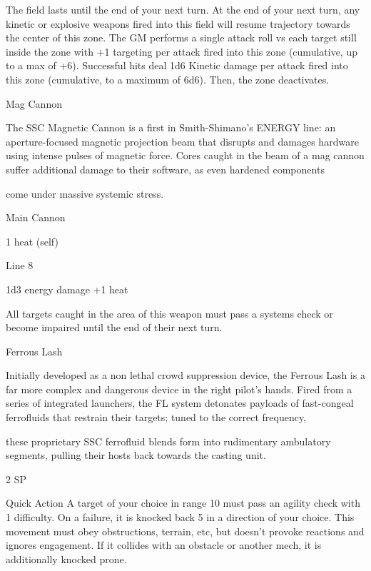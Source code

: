  The field lasts until the end of your next turn. At the end of your next turn, any kinetic or explosive  
 weapons fired into this field will resume trajectory towards the center of this zone. The GM performs a  
  single attack roll vs each target still inside the zone with +1 targeting per attack fired into this zone  
  (cumulative, up to a max of +6). Successful hits deal 1d6 Kinetic damage per attack fired into this zone  
  (cumulative, to a maximum of 6d6). Then, the zone deactivates. 

Mag Cannon  

The SSC Magnetic Cannon is a first in Smith-Shimano’s ENERGY line: an aperture-focused magnetic  
projection beam that disrupts and damages hardware using intense pulses of magnetic force. Cores caught  
in the beam of a mag cannon suffer additional damage to their software, as even hardened components  

come under massive systemic stress.   

Main Cannon
 
1 heat (self)
 
Line 8
 
1d3 energy damage +1 heat
 
All targets caught in the area of this weapon must pass a systems check or become impaired  
until the end of their next turn.
 

Ferrous Lash  

Initially developed as a non lethal crowd suppression device, the Ferrous Lash is a far more complex and  
dangerous device in the right pilot’s hands. Fired from a series of integrated launchers, the FL system  
detonates payloads of fast-congeal ferrofluids that restrain their targets; tuned to the correct frequency,  

these proprietary SSC ferrofluid blends form into rudimentary ambulatory segments, pulling their hosts  
back towards the casting unit.   

2 SP  

                                                                                                                          


Quick Action  
A target of your choice in range 10 must pass an agility check with 1 difficulty. On a failure, it is  
knocked back 5 in a direction of your choice. This movement must obey obstructions, terrain,  
etc, but doesn't provoke reactions and ignores engagement. If it collides with an obstacle or  
another mech, it is additionally knocked prone.
 

